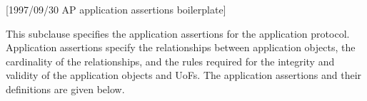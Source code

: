 [1997/09/30 AP application assertions boilerplate]

  This subclause specifies the application assertions for the
\theap\space application protocol. Application assertions
specify the relationships between application objects,
the cardinality of the relationships, and the rules required
for the integrity and validity of the application objects and
UoFs. The application assertions and their definitions are
given below.

\endinput
